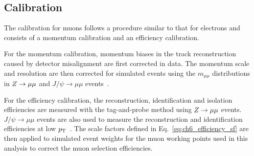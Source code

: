 \subsection{Calibration}

The calibration for muons follows a procedure similar to that for electrons and consists of a momentum calibration and an efficiency calibration.

For the momentum calibration, momentum biases in the track reconstruction caused by detector misalignment are first corrected in data.
The momentum scale and resolution are then corrected for simulated events using the $m_{\mu\mu}$ distributions in $Z\rightarrow\mu\mu$ and $J/\psi\rightarrow\mu\mu$ events~\cite{ATLAS2023MuonCalibration}.

For the efficiency calibration, the reconstruction, identification and isolation efficiencies are measured with the tag-and-probe method using $Z\rightarrow\mu\mu$ events.
$J/\psi\rightarrow\mu\mu$ events are also used to measure the reconstruction and identification efficiencies at low $p_{\mathrm{T}}$~\cite{ATLAS2021MuonID}.
The scale factors defined in Eq.~\eqref{eq:ch6_efficiency_sf} are then applied to simulated event weights for the muon working points used in this analysis to correct the muon selection efficiencies.
